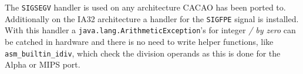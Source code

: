 The \texttt{SIGSEGV} handler is used on any architecture CACAO has
been ported to. Additionally on the IA32 architecture a handler for
the \texttt{SIGFPE} signal is installed. With this handler a
\texttt{java.lang.ArithmeticException}'s for integer \textit{/ by
zero} can be catched in hardware and there is no need to write helper
functions, like \texttt{asm\_builtin\_idiv}, which check the division
operands as this is done for the Alpha or MIPS port.
